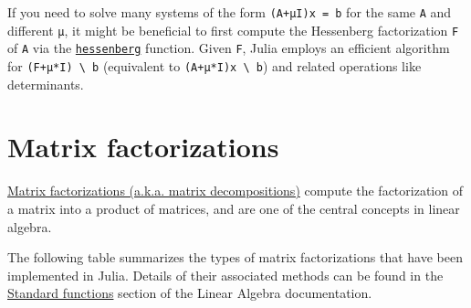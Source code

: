 If you need to solve many systems of the form \texttt{(A+μI)x = b} for the same \texttt{A} and different \texttt{μ}, it might be beneficial to first compute the Hessenberg factorization \texttt{F} of \texttt{A} via the \hyperlink{14451165250498024497}{\texttt{hessenberg}} function. Given \texttt{F}, Julia employs an efficient algorithm for \texttt{(F+μ*I) {\textbackslash} b} (equivalent to \texttt{(A+μ*I)x {\textbackslash} b}) and related operations like determinants.



\hypertarget{12615392115882150758}{}


\section{Matrix factorizations}



\href{https://en.wikipedia.org/wiki/Matrix\_decomposition}{Matrix factorizations (a.k.a. matrix decompositions)} compute the factorization of a matrix into a product of matrices, and are one of the central concepts in linear algebra.



The following table summarizes the types of matrix factorizations that have been implemented in Julia. Details of their associated methods can be found in the \hyperlink{14873423929127000343}{Standard functions} section of the Linear Algebra documentation.




